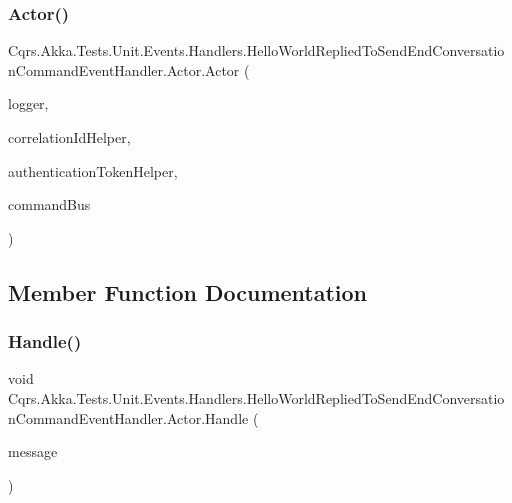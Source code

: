 \subsubsection{\texorpdfstring{Actor()}{Actor()}}
{\footnotesize\ttfamily Cqrs.\+Akka.\+Tests.\+Unit.\+Events.\+Handlers.\+Hello\+World\+Replied\+To\+Send\+End\+Conversation\+Command\+Event\+Handler.\+Actor.\+Actor (\begin{DoxyParamCaption}\item[{I\+Logger}]{logger,  }\item[{I\+Correlation\+Id\+Helper}]{correlation\+Id\+Helper,  }\item[{\hyperlink{interfaceCqrs_1_1Authentication_1_1IAuthenticationTokenHelper}{I\+Authentication\+Token\+Helper}$<$ Guid $>$}]{authentication\+Token\+Helper,  }\item[{\hyperlink{interfaceCqrs_1_1Akka_1_1Commands_1_1IAkkaCommandPublisher}{I\+Akka\+Command\+Publisher}$<$ Guid $>$}]{command\+Bus }\end{DoxyParamCaption})}



\subsection{Member Function Documentation}
\mbox{\label{classCqrs_1_1Akka_1_1Tests_1_1Unit_1_1Events_1_1Handlers_1_1HelloWorldRepliedToSendEndConversationCommandEventHandler_1_1Actor_a76a10208a1b9e3f81a36c48bc6b751eb_a76a10208a1b9e3f81a36c48bc6b751eb}} 
\subsubsection{\texorpdfstring{Handle()}{Handle()}}
{\footnotesize\ttfamily void Cqrs.\+Akka.\+Tests.\+Unit.\+Events.\+Handlers.\+Hello\+World\+Replied\+To\+Send\+End\+Conversation\+Command\+Event\+Handler.\+Actor.\+Handle (\begin{DoxyParamCaption}\item[{\hyperlink{classCqrs_1_1Akka_1_1Tests_1_1Unit_1_1Events_1_1HelloWorldRepliedTo}{Hello\+World\+Replied\+To}}]{message }\end{DoxyParamCaption})}



